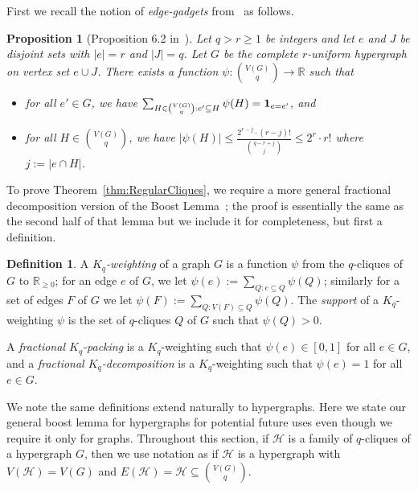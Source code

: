 \documentclass[11pt]{article}
\numberwithin{equation}{section}
\newcounter{i}
\theoremstyle{plain}
\newtheorem{proposition}[thm]{Proposition}
\theoremstyle{plain} %
\theoremstyle{definition}
\newtheorem{definition}[thm]{Definition}
\newcommand{\cH}{\mathcal{H}}
\begin{document}
First we recall the notion of \emph{edge-gadgets} from~\cite{GKLO16} as follows.

\begin{proposition}[Proposition 6.2 in~\cite{GKLO16}]\label{prop:EdgeGadget}
Let $q > r \ge 1$ be integers and let $e$ and $J$ be disjoint sets with $|e| = r$ and $|J| = q$. Let $G$ be the complete $r$-uniform hypergraph on vertex set $e\cup J$. There exists a function $\psi: \binom{V(G)}{q} \rightarrow \mathbb{R}$ such that
\begin{itemize}
    \item[(i)] for all $e'\in G$, we have $\sum_{H\in \binom{V(G)}{q}: e'\subseteq H} \psi(H) = {\bf 1}_{e=e'}$, and
    \item[(ii)] for all $H\in \binom{V(G)}{q}$, we have $|\psi(H)| \le \frac{2^{r-j}\cdot (r-j)!}{\binom{q-r+j}{j}} \le 2^r\cdot r!$ where $j:= |e\cap H|$.
\end{itemize}
\end{proposition}

To prove Theorem~\ref{thm:RegularCliques}, we require a more general fractional decomposition version of the Boost Lemma~\cite{GKLO16}; the proof is essentially the same as the second half of that lemma but we include it for completeness, but first a definition. 

\begin{definition}\label{def:fractional-decomposition}
A \emph{$K_q$-weighting} of a graph $G$ is a function $\psi$ from the $q$-cliques of $G$ to $\mathbb R_{\ge 0}$; for an edge $e$ of $G$, we let $\psi(e):= \sum_{Q: e\subseteq Q} \psi(Q)$; similarly for a set of edges $F$ of $G$ we let $\psi(F):= \sum_{Q: V(F)\subseteq Q} \psi(Q)$. The \emph{support} of a $K_q$-weighting $\psi$ is the set of $q$-cliques $Q$ of $G$ such that $\psi(Q)>0$.

A \emph{fractional $K_q$-packing} is a $K_q$-weighting such that $\psi(e)\in [0,1]$ for all $e\in G$, and a \textit{fractional $K_q$-decomposition} is a $K_q$-weighting such that $\psi(e) = 1$ for all $e \in G$.
\end{definition}

We note the same definitions extend naturally to hypergraphs. Here we state our general boost lemma for hypergraphs for potential future uses even though we require it only for graphs.  Throughout this section, if $\cH$ is a family of $q$-cliques of a hypergraph $G$, then we use notation as if $\cH$ is a hypergraph with $V(\cH) = V(G)$ and $E(\cH) = \cH \subseteq \binom{V(G)}{q}$.
\end{document}
